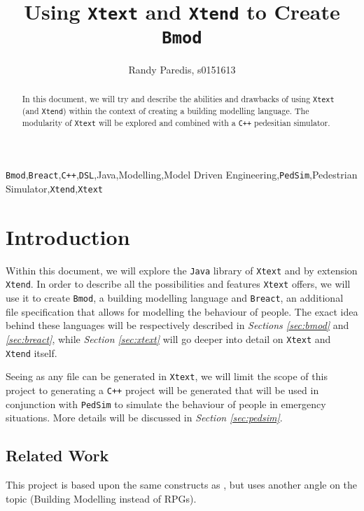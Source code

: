 \documentclass[review]{elsarticle}
\begin{document}
\begin{frontmatter}

\title{Using \texttt{Xtext} and \texttt{Xtend} to Create \texttt{Bmod}}

\author{Randy Paredis, s0151613}
\address{Master in Computer Science, University of Antwerp}

\begin{abstract}
In this document, we will try and describe the abilities and drawbacks of using \texttt{Xtext} (and \texttt{Xtend}) within the context of creating a building modelling language. The modularity of \texttt{Xtext} will be explored and combined with a \texttt{C++} pedesitian simulator.
\end{abstract}

\begin{keyword}
\texttt{Bmod}\sep\texttt{Breact}\sep\texttt{C++}\sep\texttt{DSL}\sep\textsf{Java}\sep Modelling\sep Model Driven Engineering\sep\texttt{PedSim}\sep Pedestrian Simulator\sep\texttt{Xtend}\sep\texttt{Xtext}
\end{keyword}

\end{frontmatter}

\linenumbers

\section{Introduction}
Within this document, we will explore the \texttt{Java} library of \texttt{Xtext} \cite{xtext} and by extension \texttt{Xtend}. In order to describe all the possibilities and features \texttt{Xtext} offers, we will use it to create \texttt{Bmod}, a building modelling language and \texttt{Breact}, an additional file specification that allows for modelling the behaviour of people. The exact idea behind these languages will be respectively described in \textsl{Sections \ref{sec:bmod}} and \textsl{\ref{sec:breact}}, while \textsl{Section \ref{sec:xtext}} will go deeper into detail on \texttt{Xtext} and \texttt{Xtend} itself. 

Seeing as any file can be generated in \texttt{Xtext}, we will limit the scope of this project to generating a \texttt{C++} project will be generated that will be used in conjunction with \texttt{PedSim}\cite{pedsim} to simulate the behaviour of people in emergency situations. More details will be discussed in \textsl{Section \ref{sec:pedsim}}.

\subsection{Related Work}
This project is based upon the same constructs as \cite{Hannu2014}, but uses another angle on the topic (Building Modelling instead of RPGs).
\end{document}
